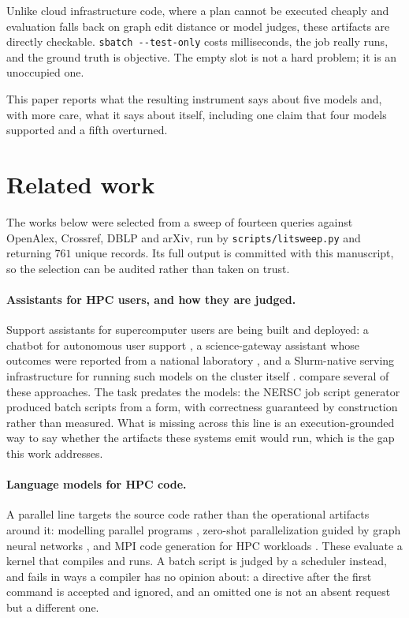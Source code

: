 \documentclass[11pt,a4paper]{article}
\begin{document}
Unlike cloud infrastructure code, where a plan cannot be executed cheaply and evaluation falls back
on graph edit distance or model judges, these artifacts are directly checkable.
\verb|sbatch --test-only| costs milliseconds, the job really runs, and the ground truth is
objective. The empty slot is not a hard problem; it is an unoccupied one.

This paper reports what the resulting instrument says about five models and, with more care, what
it says about itself, including one claim that four models supported and a fifth overturned.

\section{Related work}

The works below were selected from a sweep of fourteen queries against OpenAlex, Crossref, DBLP
and arXiv, run by \texttt{scripts/litsweep.py} and returning $761$ unique records. Its full output
is committed with this manuscript, so the selection can be audited rather than taken on trust.

\paragraph{Assistants for HPC users, and how they are judged.} Support assistants for
supercomputer users are being built and deployed: a chatbot for autonomous user support
\citep{pasupuleti2025chatbot}, a science-gateway assistant whose outcomes were reported from a
national laboratory \citep{biggs2024gateway}, and a Slurm-native serving infrastructure for running
such models on the cluster itself \citep{doosthosseini2024chatai}. \citet{zheng2026comparative}
compare several of these approaches. The task predates the models: the NERSC job script generator
\citep{shao2022nersc} produced batch scripts from a form, with correctness guaranteed by
construction rather than measured. What is missing across this line is an execution-grounded way to
say whether the artifacts these systems emit would run, which is the gap this work addresses.

\paragraph{Language models for HPC code.} A parallel line targets the source code rather than the
operational artifacts around it: modelling parallel programs \citep{nichols2023hpccoder}, zero-shot
parallelization guided by graph neural networks \citep{mahmud2023autoparllm}, and MPI code
generation for HPC workloads \citep{valerolara2026chatmpi}. These evaluate a kernel that compiles
and runs. A batch script is judged by a scheduler instead, and fails in ways a compiler has no
opinion about: a directive after the first command is accepted and ignored, and an omitted one is
not an absent request but a different one.
\end{document}
